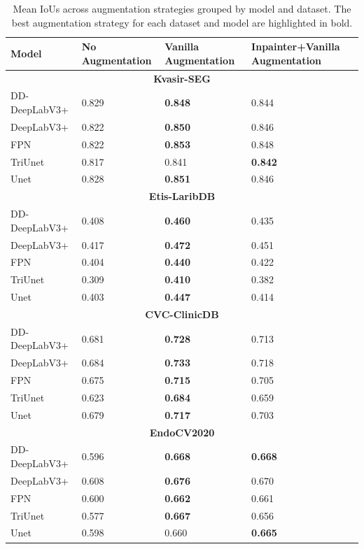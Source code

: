 \begin{table}[htb]
    \centering
\begin{tabularx}{\linewidth}{lXXX}
\toprule
Model & No Augmentation & Vanilla Augmentation & Inpainter+Vanilla Augmentation\\
\midrule
\multicolumn{4}{c}{\textbf{Kvasir-SEG }}\\
\midrule
           DD-DeepLabV3+     & 0.829 & \textbf{0.848} & 0.844\\
           DeepLabV3+        & 0.822 & \textbf{0.850} & 0.846\\
           FPN               & 0.822 & \textbf{0.853} & 0.848\\
           TriUnet           & 0.817 & 0.841          & \textbf{0.842}\\
           Unet              & 0.828 & \textbf{0.851} & 0.846\\
\midrule
\multicolumn{4}{c}{\textbf{Etis-LaribDB}}\\
\midrule
           DD-DeepLabV3+     & 0.408 & \textbf{0.460} & 0.435\\
           DeepLabV3+        & 0.417 & \textbf{0.472} & 0.451\\
           FPN               & 0.404 & \textbf{0.440} & 0.422\\
           TriUnet           & 0.309 & \textbf{0.410} & 0.382\\
           Unet              & 0.403 & \textbf{0.447} & 0.414\\
\midrule
\multicolumn{4}{c}{\textbf{CVC-ClinicDB}}\\
\midrule

           DD-DeepLabV3+     & 0.681 & \textbf{0.728} & 0.713\\
           DeepLabV3+        & 0.684 & \textbf{0.733} & 0.718\\
           FPN               & 0.675 & \textbf{0.715} & 0.705\\
           TriUnet           & 0.623 & \textbf{0.684} & 0.659\\
           Unet              & 0.679 & \textbf{0.717} & 0.703\\
\midrule
\multicolumn{4}{c}{\textbf{EndoCV2020}}\\
\midrule
           DD-DeepLabV3+     & 0.596 & \textbf{0.668} & \textbf{0.668}\\
           DeepLabV3+        & 0.608 & \textbf{0.676} & 0.670\\
           FPN               & 0.600 & \textbf{0.662} & 0.661\\
           TriUnet           & 0.577 & \textbf{0.667} & 0.656\\
           Unet              & 0.598 & 0.660          & \textbf{0.665}\\
\bottomrule
\end{tabularx}
    \caption[Mean IoUs across augmentation strategies grouped by model and dataset.]{Mean IoUs across augmentation strategies grouped by model and dataset. The best augmentation strategy for each dataset and model are highlighted in bold. }
    \label{tab:aug_ious}
\end{table}

